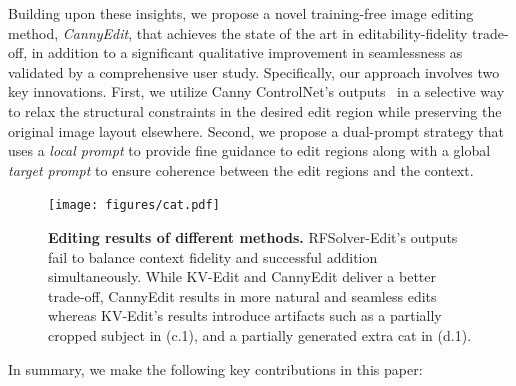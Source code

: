 \documentclass{article}
\begin{document}
Building upon these insights, we propose a novel training-free image editing method, \emph{CannyEdit}, that achieves the state of the art in editability-fidelity trade-off, in addition to a significant qualitative improvement in seamlessness as validated by a comprehensive user study.
Specifically, our approach involves two key innovations.
First, we utilize Canny ControlNet's outputs~\citep{zhang2023adding} in a selective way to relax the structural constraints in the desired edit region while preserving the original image layout elsewhere.
Second, we propose a dual-prompt strategy that uses a \emph{local prompt} to provide fine guidance to edit regions along with a global \emph{target prompt} to ensure coherence between the edit regions and the context.

\begin{figure}[t]

    \centering
    \texttt{[image: figures/cat.pdf]}
      \caption{\textbf{Editing results of different methods.} RFSolver-Edit's outputs fail to balance context fidelity and successful addition simultaneously. While KV-Edit and CannyEdit deliver a better trade-off, CannyEdit results in more natural and seamless edits whereas KV-Edit's results introduce artifacts such as a {partially cropped subject} in (c.1), and {a partially generated extra cat} in (d.1).}
    \label{fig2}
\end{figure}



In summary, we make the following key contributions in this paper:
\end{document}

